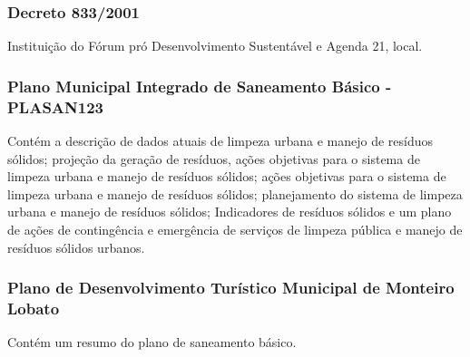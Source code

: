 \begin{subapend}
\begin{subsubapend}
		\subsubsection{Decreto 833/2001}
		Instituição do Fórum pró Desenvolvimento Sustentável e Agenda 21, local.
		\subsubsection{Plano Municipal Integrado de Saneamento Básico - PLASAN123}
		Contém a descrição de dados atuais de limpeza urbana e manejo de resíduos sólidos; projeção da geração de resíduos, ações objetivas para o sistema de limpeza urbana e manejo de resíduos sólidos; ações objetivas para o sistema de limpeza urbana e manejo de resíduos sólidos; planejamento do sistema de limpeza urbana e manejo de resíduos sólidos; Indicadores de resíduos sólidos e um plano de ações de contingência e emergência de serviços de limpeza pública e manejo de resíduos sólidos urbanos.
		\subsubsection{Plano de Desenvolvimento Turístico Municipal de Monteiro Lobato}
		Contém um resumo do plano de saneamento básico.
	\end{subsubapend}
\end{subapend}

















